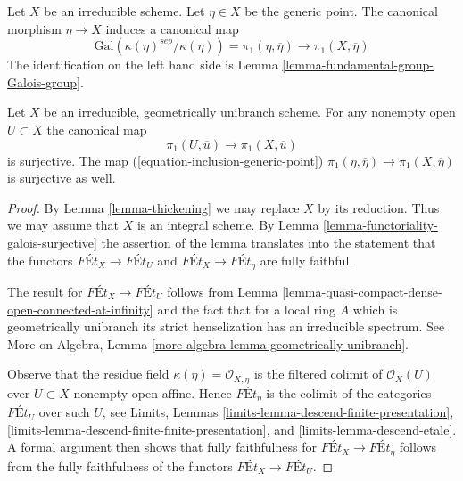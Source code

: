 \noindent
Let $X$ be an irreducible scheme. Let $\eta \in X$ be the generic
point. The canonical morphism $\eta \to X$ induces a canonical map
\begin{equation}
\label{equation-inclusion-generic-point}
\text{Gal}(\kappa(\eta)^{sep}/\kappa(\eta)) = \pi_1(\eta, \overline{\eta})
\longrightarrow \pi_1(X, \overline{\eta})
\end{equation}
The identification on the left hand side is
Lemma \ref{lemma-fundamental-group-Galois-group}.

\begin{lemma}
\label{lemma-irreducible-geometrically-unibranch}
Let $X$ be an irreducible, geometrically unibranch scheme.
For any nonempty open $U \subset X$ the canonical map
$$
\pi_1(U, \overline{u}) \longrightarrow \pi_1(X, \overline{u})
$$
is surjective. The map (\ref{equation-inclusion-generic-point})
$\pi_1(\eta, \overline{\eta}) \to \pi_1(X, \overline{\eta})$
is surjective as well.
\end{lemma}

\begin{proof}
By Lemma \ref{lemma-thickening} we may replace $X$ by its reduction.
Thus we may assume that $X$ is an integral scheme. By
Lemma \ref{lemma-functoriality-galois-surjective}
the assertion of the lemma translates into the statement that
the functors $\textit{F\'Et}_X \to \textit{F\'Et}_U$ and
$\textit{F\'Et}_X \to \textit{F\'Et}_\eta$ are fully faithful.

\medskip\noindent
The result for $\textit{F\'Et}_X \to \textit{F\'Et}_U$ follows
from Lemma \ref{lemma-quasi-compact-dense-open-connected-at-infinity}
and the fact that for a local ring $A$ which is
geometrically unibranch its strict henselization has an
irreducible spectrum. See
More on Algebra, Lemma \ref{more-algebra-lemma-geometrically-unibranch}.

\medskip\noindent
Observe that the residue field $\kappa(\eta) = \mathcal{O}_{X, \eta}$
is the filtered colimit of $\mathcal{O}_X(U)$ over $U \subset X$
nonempty open affine. Hence $\textit{F\'Et}_\eta$ is the colimit of the
categories $\textit{F\'Et}_U$ over such $U$, see
Limits, Lemmas \ref{limits-lemma-descend-finite-presentation},
\ref{limits-lemma-descend-finite-finite-presentation}, and
\ref{limits-lemma-descend-etale}.
A formal argument then shows that fully faithfulness for
$\textit{F\'Et}_X \to \textit{F\'Et}_\eta$ follows from the
fully faithfulness of the functors $\textit{F\'Et}_X \to \textit{F\'Et}_U$.
\end{proof}


